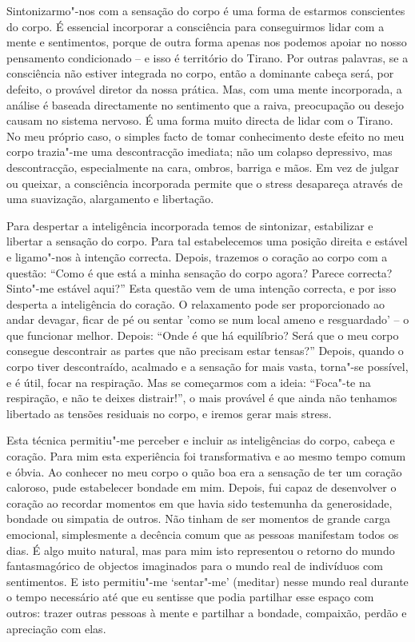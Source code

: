 Sintonizarmo"-nos com a sensação do corpo é uma forma de estarmos
conscientes do corpo. É essencial incorporar a consciência para
conseguirmos lidar com a mente e sentimentos, porque de outra forma
apenas nos podemos apoiar no nosso pensamento condicionado -- e isso é
território do Tirano. Por outras palavras, se a consciência não estiver
integrada no corpo, então a dominante cabeça será, por defeito, o
provável diretor da nossa prática. Mas, com uma mente incorporada, a
análise é baseada directamente no sentimento que a raiva, preocupação ou
desejo causam no sistema nervoso. É uma forma muito directa de lidar com
o Tirano. No meu próprio caso, o simples facto de tomar conhecimento
deste efeito no meu corpo trazia"-me uma descontracção imediata; não um
colapso depressivo, mas descontracção, especialmente na cara, ombros,
barriga e mãos. Em vez de julgar ou queixar, a consciência incorporada
permite que o stress desapareça através de uma suavização, alargamento e
libertação.

\sectionBreak

Para despertar a inteligência incorporada temos de sintonizar,
estabilizar e libertar a sensação do corpo. Para tal estabelecemos uma
posição direita e estável e ligamo"-nos à intenção correcta. Depois,
trazemos o coração ao corpo com a questão: “Como é que está a minha
sensação do corpo agora? Parece correcta? Sinto"-me estável aqui?” Esta
questão vem de uma intenção correcta, e por isso desperta a inteligência
do coração. O relaxamento pode ser proporcionado ao andar devagar, ficar
de pé ou sentar 'como se num local ameno e resguardado' -- o que
funcionar melhor. Depois: “Onde é que há equilíbrio? Será que o meu
corpo consegue descontrair as partes que não precisam estar tensas?”
Depois, quando o corpo tiver descontraído, acalmado e a sensação for
mais vasta, torna"-se possível, e é útil, focar na respiração. Mas se
começarmos com a ideia: “Foca"-te na respiração, e não te deixes
distrair!”, o mais provável é que ainda não tenhamos libertado as
tensões residuais no corpo, e iremos gerar mais stress.

Esta técnica permitiu"-me perceber e incluir as inteligências do corpo,
cabeça e coração. Para mim esta experiência foi transformativa e ao
mesmo tempo comum e óbvia. Ao conhecer no meu corpo o quão boa era a
sensação de ter um coração caloroso, pude estabelecer bondade em mim.
Depois, fui capaz de desenvolver o coração ao recordar momentos em que
havia sido testemunha da generosidade, bondade ou simpatia de outros.
Não tinham de ser momentos de grande carga emocional, simplesmente a
decência comum que as pessoas manifestam todos os dias. É algo muito
natural, mas para mim isto representou o retorno do mundo fantasmagórico
de objectos imaginados para o mundo real de indivíduos com sentimentos. E
isto permitiu"-me `sentar"-me' (meditar) nesse mundo real durante o tempo
necessário até que eu sentisse que podia partilhar esse espaço com
outros: trazer outras pessoas à mente e partilhar a bondade, compaixão,
perdão e apreciação com elas.


